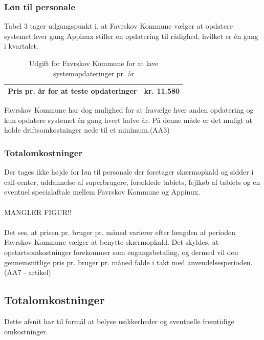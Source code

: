 \subsubsection{Løn til personale}
Tabel 3 tager udgangspunkt i, at Favrskov Kommune vælger at opdatere systemet hver gang Appinux stiller en opdatering til rådighed, hvilket er én gang i kvartalet. 

\begin{table}[H]
	\caption{Udgift for Favrskov Kommune for at lave systemopdateringer pr. år}
	\centering
	\label{tab:tabelpersonaleudgift}
	\begin{tabularx}{\textwidth}{|X|X|}
		\hline
		Pris pr. år for at teste opdateringer
		& kr. 11.580\\ 
		\hline
	\end{tabularx}
\end{table}
Favrskov Kommune har dog mulighed for at fravælge hver anden opdatering og kun opdatere systemet én gang hvert halve år. På denne måde er det muligt at holde driftsomkostninger nede til et minimum.(AA3) 
\subsubsection{Totalomkostninger}
Der tages ikke højde for løn til personale der foretager skærmopkald og sidder i call-center, uddannelse af superbrugere, forældede tablets, fejlkøb af tablets og en eventuel specialaftale mellem Favrskov Kommune og Appinux.\\ \\

MANGLER FIGUR!!\\ \\

Det ses, at prisen pr. bruger pr. måned varierer efter længden af perioden Favrskov Kommune vælger at benytte skærmopkald. Det skyldes, at opstartsomkostninger forekommer som engangsbetaling, og dermed vil den gennemsnitlige pris pr. bruger pr. måned falde i takt med anvendelsesperioden. 
(AA7 - artikel)
\subsection{Totalomkostninger}
Dette afsnit har til formål at belyse usikkerheder og eventuelle fremtidige omkostninger. 

